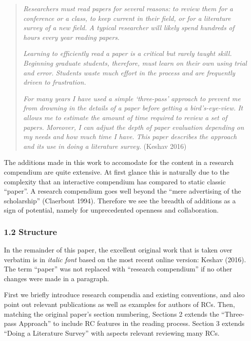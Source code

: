\documentclass[fleqn,10pt]{wlpeerj} %
\begin{document}
\begin{quote}
\emph{Researchers must read papers for several reasons:} \emph{to review
them for a conference or a class, to keep current in their field, or for
a literature survey of a new field.} \emph{A typical researcher will
likely spend hundreds of hours every year reading papers.}

\emph{Learning to efficiently read a paper is a critical but rarely
taught skill.} \emph{Beginning graduate students, therefore, must learn
on their own using trial and error.} \emph{Students waste much effort in
the process and are frequently driven to frustration.}

\emph{For many years I have used a simple `three-pass' approach to
prevent me from drowning in the details of a paper before getting a
bird's-eye-view.} \emph{It allows me to estimate the amount of time
required to review a set of papers.} \emph{Moreover, I can adjust the
depth of paper evaluation depending on my needs and how much time I
have.} \emph{This paper describes the approach and its use in doing a
literature survey.} (Keshav 2016)
\end{quote}

The additions made in this work to accomodate for the content in a
research compendium are quite extensive. At first glance this is
naturally due to the complexity that an interactive compendium has
compared to static classic ``paper''. A research compendium goes well
beyond the ``mere advertising of the scholarship'' (Claerbout 1994).
Therefore we see the breadth of additions as a sign of potential, namely
for unprecedented openness and collaboration.

\subsubsection*{1.2 Structure}\label{structure}

In the remainder of this paper, the excellent original work that is
taken over verbatim is in \emph{italic font} based on the most recent
online version: Keshav (2016). The term ``paper'' was not replaced with
``research compendium'' if no other changes were made in a paragraph.

First we briefly introduce research compendia and existing conventions,
and also point out relevant publications as well as examples for authors
of RCs. Then, matching the original paper's section numbering, Sections
2 extends the ``Three-pass Approach'' to include RC features in the
reading process. Section 3 extends ``Doing a Literature Survey'' with
aspects relevant reviewing many RCs.
\end{document}
